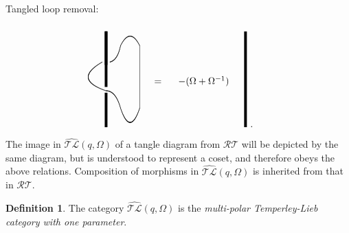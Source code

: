 \documentclass[12pt]{amsart}
\theoremstyle{definition}
\newtheorem{definition}[theorem]{Definition}
\theoremstyle{remark}
\numberwithin{equation}{section}
\newcommand{\tl}{Temperley-Lieb }
\newcommand{\ATLC}{{\widehat{\mathcal{TL}}}}
\newcommand{\RTC}{\mathcal{RT}}
\begin{document}
\noindent Tangled loop removal:
\[
\begin{picture}(150, 100)(-90,0)
{
\linethickness{1mm}
\put(-15, 65){\line(0, 1){35}}
\put(-15, 42){\line(0, 1){58}}
\put(-15, 0){\line(0, 1){36}}
}

\qbezier(-19, 68)(-50, 50)(-15, 38)

\qbezier(-11, 68)(-3, 70)(0, 85)

\qbezier(-15, 38)(-5, 38)(0, 20)

\put(20, 20){\line(0, 1){65}}

\qbezier(0, 20)(10, -10 ) (20, 20)
\qbezier(0, 85)(10, 105) (20, 85)

\put(35, 45){$=$}
\end{picture}
%
\begin{picture}(150, 110)(-50,0)
\put(-50, 45){$-(\Omega+\Omega^{-1})$}
{
\linethickness{1mm}
\put(20, 0){\line(0, 1){100}}
}

\put(25, 0){.}
\end{picture}
\]

The image in $\ATLC(q, \Omega)$ of a tangle diagram from $\RTC$ will be  depicted by the same diagram, but is understood to represent a coset, and therefore obeys the above relations. Composition of morphisms  in $\ATLC(q, \Omega)$ is inherited from that in $\RTC$. 

\begin{definition}\label{def:ATLC-q}
The category $\ATLC(q, \Omega)$ is  the {\em multi-polar \tl category with one parameter}.
\end{definition}
\end{document}
